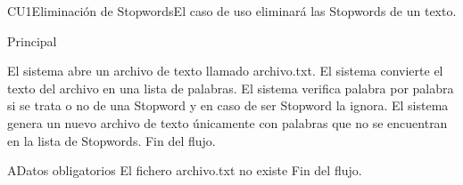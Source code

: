 
% 



	

	\begin{UseCase}{CU1}{Eliminaci\'on de Stopwords}{El caso de uso eliminar\'a las Stopwords de un texto.
	}
	\end{UseCase}

	\begin{UCtrayectoria}{Principal}
	
		\UCpaso  El sistema abre un archivo de texto llamado archivo.txt. 
                \UCpaso El sistema convierte el texto del archivo en una lista de palabras.
		\UCpaso El sistema verifica palabra por palabra si se trata o no de una Stopword y en caso de ser Stopword la ignora.
		\UCpaso  El sistema genera un nuevo archivo de texto \'unicamente con palabras que no se encuentran en la lista de Stopwords.
				    \UCpaso[] Fin del flujo.
	\end{UCtrayectoria}
	
			\begin{UCtrayectoriaA}{A}{Datos obligatorios}
		    \UCpaso El fichero archivo.txt no existe
		    \UCpaso[] Fin del flujo.
    		\end{UCtrayectoriaA}

		
